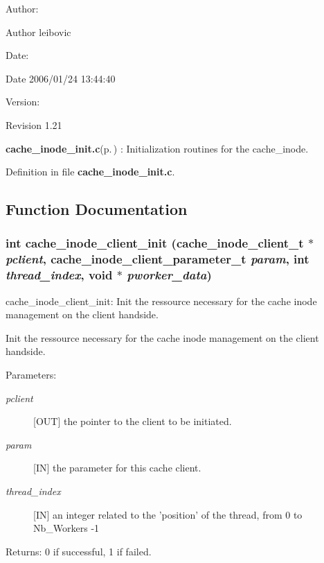 \begin{Desc}
\item[Author:]\begin{Desc}
\item[Author]leibovic \end{Desc}
\end{Desc}
\begin{Desc}
\item[Date:]\begin{Desc}
\item[Date]2006/01/24 13:44:40 \end{Desc}
\end{Desc}
\begin{Desc}
\item[Version:]\begin{Desc}
\item[Revision]1.21 \end{Desc}
\end{Desc}
{\bf cache\_\-inode\_\-init.c}{\rm (p.\,\pageref{cache__inode__init_8c})} : Initialization routines for the cache\_\-inode.

Definition in file {\bf cache\_\-inode\_\-init.c}.

\subsection{Function Documentation}
\subsubsection{\setlength{\rightskip}{0pt plus 5cm}int cache\_\-inode\_\-client\_\-init (cache\_\-inode\_\-client\_\-t $\ast$ {\em pclient}, cache\_\-inode\_\-client\_\-parameter\_\-t {\em param}, int {\em thread\_\-index}, void $\ast$ {\em pworker\_\-data})}\label{cache__inode__init_8c_a1}


cache\_\-inode\_\-client\_\-init: Init the ressource necessary for the cache inode management on the client handside.

Init the ressource necessary for the cache inode management on the client handside.

\begin{Desc}
\item[Parameters:]
\begin{description}
\item[{\em pclient}][OUT] the pointer to the client to be initiated. \item[{\em param}][IN] the parameter for this cache client. \item[{\em thread\_\-index}][IN] an integer related to the 'position' of the thread, from 0 to Nb\_\-Workers -1\end{description}
\end{Desc}
\begin{Desc}
\item[Returns:]0 if successful, 1 if failed. \end{Desc}


